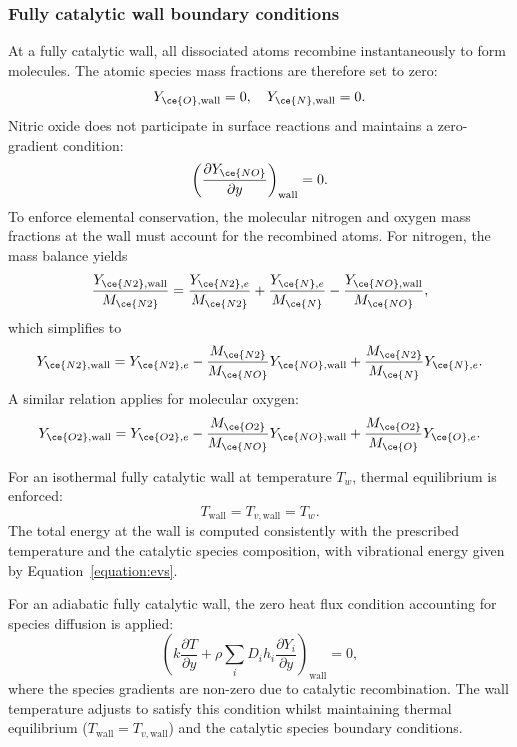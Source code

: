 \subsubsection{Fully catalytic wall boundary conditions}

At a fully catalytic wall, all dissociated atoms recombine instantaneously to form molecules. The atomic species mass fractions are therefore set to zero:
\begin{equation}
Y_{\ce{O},\text{wall}} = 0, \quad Y_{\ce{N},\text{wall}} = 0.
\end{equation}
Nitric oxide does not participate in surface reactions and maintains a zero-gradient condition:
\begin{equation}
\left( \frac{\partial Y_{\ce{NO}}}{\partial y} \right)_{\text{wall}} = 0.
\end{equation}
To enforce elemental conservation, the molecular nitrogen and oxygen mass fractions at the wall must account for the recombined atoms. For nitrogen, the mass balance yields
\begin{equation}
\frac{Y_{\ce{N2},\text{wall}}}{M_{\ce{N2}}} = \frac{Y_{\ce{N2},e}}{M_{\ce{N2}}} + \frac{Y_{\ce{N},e}}{M_{\ce{N}}} - \frac{Y_{\ce{NO},\text{wall}}}{M_{\ce{NO}}},
\end{equation}
which simplifies to
\begin{equation}
Y_{\ce{N2},\text{wall}} = Y_{\ce{N2},e} - \frac{M_{\ce{N2}}}{M_{\ce{NO}}} Y_{\ce{NO},\text{wall}} + \frac{M_{\ce{N2}}}{M_{\ce{N}}} Y_{\ce{N},e}.
\end{equation}
A similar relation applies for molecular oxygen:
\begin{equation}
Y_{\ce{O2},\text{wall}} = Y_{\ce{O2},e} - \frac{M_{\ce{O2}}}{M_{\ce{NO}}} Y_{\ce{NO},\text{wall}} + \frac{M_{\ce{O2}}}{M_{\ce{O}}} Y_{\ce{O},e}.
\end{equation}

For an isothermal fully catalytic wall at temperature $T_w$, thermal equilibrium is enforced:
\begin{equation}
T_{\text{wall}} = T_{v,\text{wall}} = T_w.
\end{equation}
The total energy at the wall is computed consistently with the prescribed temperature and the catalytic species composition, with vibrational energy given by Equation~\eqref{equation:evs}.

For an adiabatic fully catalytic wall, the zero heat flux condition accounting for species diffusion is applied:
\begin{equation}
\left( k \frac{\partial T}{\partial y} + \rho \sum_i D_i h_i \frac{\partial Y_i}{\partial y} \right)_{\text{wall}} = 0,
\end{equation}
where the species gradients are non-zero due to catalytic recombination. The wall temperature adjusts to satisfy this condition whilst maintaining thermal equilibrium ($T_{\text{wall}} = T_{v,\text{wall}}$) and the catalytic species boundary conditions.


